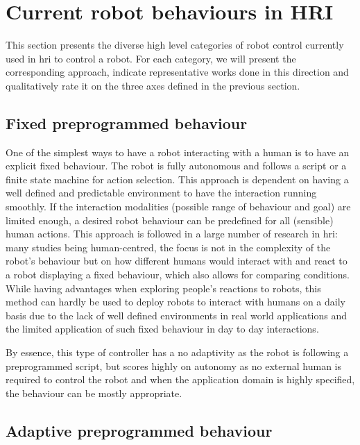 \section{Current robot behaviours in HRI} \label{sec:back_behaviour}

    This section presents the diverse high level categories of robot control currently used in \gls{hri} to control a robot. 
    For each category, we will present the corresponding approach, indicate representative works done in this direction and qualitatively rate it on the three axes defined in the previous section.
	
\subsection{Fixed preprogrammed behaviour}

    One of the simplest ways to have a robot interacting with a human is to have an explicit fixed behaviour. The robot is fully autonomous and follows a script or a finite state machine for action selection. This approach is dependent on having a well defined and predictable environment to have the interaction running smoothly. If the interaction modalities (possible range of behaviour and goal) are limited enough, a desired robot behaviour can be predefined for all (sensible) human actions. This approach is followed in a large number of research in \gls{hri}: many studies being human-centred, the focus is not in the complexity of the robot's behaviour but on how different humans would interact with and react to a robot displaying a fixed behaviour, which also allows for comparing conditions. While having advantages when exploring people's reactions to robots, this method can hardly be used to deploy robots to interact with humans on a daily basis due to the lack of well defined environments in real world applications and the limited application of such fixed behaviour in day to day interactions.

    By essence, this type of controller has a no adaptivity as the robot is following a preprogrammed script, but scores highly on autonomy as no external human is required to control the robot and when the application domain is highly specified, the behaviour can be mostly appropriate.

\subsection{Adaptive preprogrammed behaviour}
	

